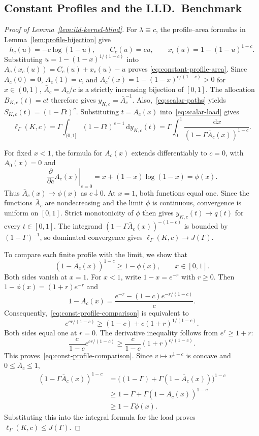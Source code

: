 \documentclass[11pt]{article}
\theoremstyle{definition}
\theoremstyle{remark}
\newcommand{\dd}{\,\mathrm d}
\begin{document}
\subsection{Constant Profiles and the I.I.D.\ Benchmark}
\label{app:iid-benchmark}

\begin{proof}[Proof of Lemma~\ref{lem:iid-kernel-blind}]
For $\lambda\equiv c$, the profile--area formulas in
Lemma~\ref{lem:profile-bijection} give
\[
 h_c(u)=-c\log(1-u),\qquad C_c(u)=cu,\qquad
 x_c(u)=1-(1-u)^{1-c}.
\]
Substituting $u=1-(1-x)^{1/(1-c)}$ into
$A_c(x_c(u))=C_c(u)+x_c(u)-u$ proves
\eqref{eq:constant-profile-area}.
Since $A_c(0)=0$, $A_c(1)=c$, and
$A_c'(x)=1-(1-x)^{c/(1-c)}>0$ for $x\in(0,1)$,
$\bar A_c=A_c/c$ is a strictly increasing bijection of $[0,1]$.
The allocation $B_{K,c}(t)=ct$ therefore gives
$y_{K,c}=\bar A_c^{-1}$.
Also,~\eqref{eq:scalar-paths} yields
$S_{K,c}(t)=(1-\Gamma t)^c$.
Substituting $t=\bar A_c(x)$ into~\eqref{eq:scalar-load} gives
\[
 \ell_\Gamma(K,c)
 =\Gamma\int_{(0,1]}(1-\Gamma t)^{c-1}\dd y_{K,c}(t)
 =\Gamma\int_0^1
   \frac{\dd x}{(1-\Gamma\bar A_c(x))^{1-c}}.
\]

For fixed $x<1$, the formula for $A_c(x)$ extends differentiably to
$c=0$, with $A_0(x)=0$ and
\[
 \left.\frac{\partial}{\partial c}A_c(x)\right|_{c=0}
 =x+(1-x)\log(1-x)=\phi(x).
\]
Thus $\bar A_c(x)\to\phi(x)$ as $c\downarrow0$.
At $x=1$, both functions equal one.
Since the functions $\bar A_c$ are nondecreasing and the limit $\phi$
is continuous, convergence is uniform on $[0,1]$.
Strict monotonicity of $\phi$ then gives
$y_{K,c}(t)\to q(t)$ for every $t\in[0,1]$.
The integrand $(1-\Gamma\bar A_c(x))^{-(1-c)}$ is bounded by
$(1-\Gamma)^{-1}$, so dominated convergence gives
$\ell_\Gamma(K,c)\to J(\Gamma)$.

To compare each finite profile with the limit, we show that
\begin{equation}\label{eq:const-profile-comparison}
 (1-\bar A_c(x))^{1-c}\ge1-\phi(x),
 \qquad x\in[0,1].
\end{equation}
Both sides vanish at $x=1$.
For $x<1$, write $1-x=e^{-r}$ with $r\ge0$.
Then $1-\phi(x)=(1+r)e^{-r}$ and
\[
 1-\bar A_c(x)
 =\frac{e^{-r}-(1-c)e^{-r/(1-c)}}{c}.
\]
Consequently,~\eqref{eq:const-profile-comparison} is equivalent to
\[
 e^{cr/(1-c)}\ge(1-c)+c(1+r)^{1/(1-c)}.
\]
Both sides equal one at $r=0$.
The derivative inequality follows from $e^r\ge1+r$:
\[
 \frac{c}{1-c}e^{cr/(1-c)}
 \ge\frac{c}{1-c}(1+r)^{c/(1-c)}.
\]
This proves~\eqref{eq:const-profile-comparison}.
Since $v\mapsto v^{1-c}$ is concave and $0\le\bar A_c\le1$,
\[
\begin{aligned}
 (1-\Gamma\bar A_c(x))^{1-c}
 &=\bigl((1-\Gamma)+\Gamma(1-\bar A_c(x))\bigr)^{1-c}\\
 &\ge1-\Gamma+\Gamma(1-\bar A_c(x))^{1-c}\\
 &\ge1-\Gamma\phi(x).
\end{aligned}
\]
Substituting this into the integral formula for the load proves
$\ell_\Gamma(K,c)\le J(\Gamma)$.
\end{proof}
\end{document}
